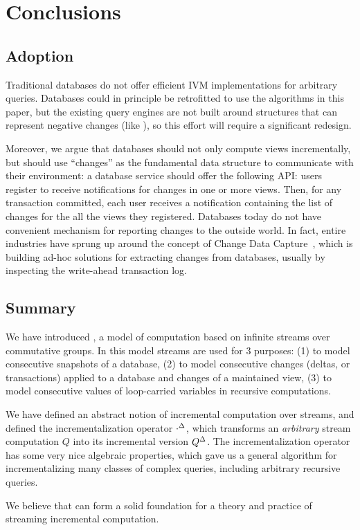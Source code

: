 \section{Conclusions}\label{sec:conclusions}%

\subsection{Adoption}

Traditional databases do not offer efficient IVM implementations for
arbitrary queries.  Databases could in principle be retrofitted to use
the algorithms in this paper, but the existing query engines are not
built around structures that can represent negative changes (like
\zrs), so this effort will require a significant redesign.

Moreover, we argue that databases should not only compute views
incrementally, but should use ``changes'' as the fundamental data
structure to communicate with their environment: a database service
should offer the following API: users register to receive
notifications for changes in one or more views.  Then, for any
transaction committed, each user receives a notification containing
the list of changes for the all the views they registered.  Databases
today do not have convenient mechanism for reporting changes to the
outside world.  In fact, entire industries have sprung up around the
concept of Change Data Capture~\cite{cdc}, which is building ad-hoc
solutions for extracting changes from databases, usually by inspecting
the write-ahead transaction log.

\subsection{Summary}

We have introduced \dbsp, a model of computation based on infinite
streams over commutative groups.  In this model streams are used for 3
purposes: (1) to model consecutive snapshots of a database, (2) to
model consecutive changes (deltas, or transactions) applied to a
database and changes of a maintained view, (3) to model consecutive
values of loop-carried variables in recursive computations.

We have defined an abstract notion of incremental computation over
streams, and defined the incrementalization operator ${\cdot}^{\Delta}$,
which transforms an \emph{arbitrary} stream computation $Q$ into its
incremental version ${Q}^{\Delta}$.  The incrementalization operator has
some very nice algebraic properties, which gave us a general algorithm
for incrementalizing many classes of complex queries, including
arbitrary recursive queries.

We believe that \dbsp can form a solid foundation for a theory and
practice of streaming incremental computation.
